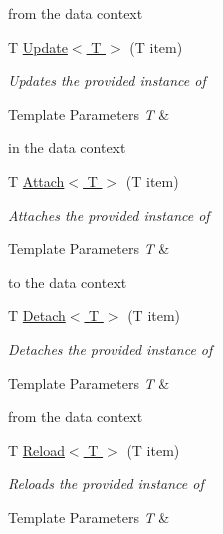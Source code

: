\begin{DoxyCompactItemize}
\begin{DoxyCompactList}
from the data context \end{DoxyCompactList}\item 
T \hyperlink{class_framework_extension_1_1_entity_framework_1_1_tests_1_1_unit_tests_1_1_commit_events_mock_context_a0aa0024cf61064e9051e8d722de73a0d}{Update$<$ T $>$} (T item)
\begin{DoxyCompactList}\small\item\em Updates the provided instance of 
\begin{DoxyTemplParams}{Template Parameters}
{\em T} & \\
\hline
\end{DoxyTemplParams}
in the data context \end{DoxyCompactList}\item 
T \hyperlink{class_framework_extension_1_1_entity_framework_1_1_tests_1_1_unit_tests_1_1_commit_events_mock_context_a72aa5f2c99575ef7cce06d776fbb961d}{Attach$<$ T $>$} (T item)
\begin{DoxyCompactList}\small\item\em Attaches the provided instance of 
\begin{DoxyTemplParams}{Template Parameters}
{\em T} & \\
\hline
\end{DoxyTemplParams}
to the data context \end{DoxyCompactList}\item 
T \hyperlink{class_framework_extension_1_1_entity_framework_1_1_tests_1_1_unit_tests_1_1_commit_events_mock_context_a423a62019fb58dfba4170ecd39e4ccfa}{Detach$<$ T $>$} (T item)
\begin{DoxyCompactList}\small\item\em Detaches the provided instance of 
\begin{DoxyTemplParams}{Template Parameters}
{\em T} & \\
\hline
\end{DoxyTemplParams}
from the data context \end{DoxyCompactList}\item 
T \hyperlink{class_framework_extension_1_1_entity_framework_1_1_tests_1_1_unit_tests_1_1_commit_events_mock_context_a50db55322f05c529687fd244b57cdcb9}{Reload$<$ T $>$} (T item)
\begin{DoxyCompactList}\small\item\em Reloads the provided instance of 
\begin{DoxyTemplParams}{Template Parameters}
{\em T} & \\
\hline

\end{DoxyTemplParams}
\end{DoxyCompactList}
\end{DoxyCompactItemize}
